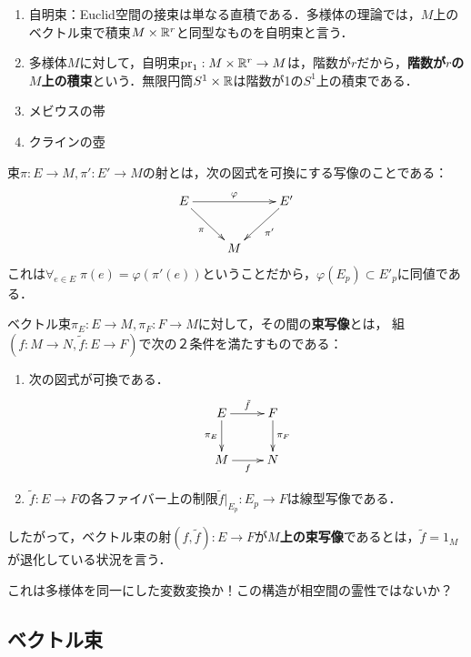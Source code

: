 \documentclass[uplatex,dvipdfmx]{jsreport}
\begin{document}
\begin{example}\mbox{}
    \begin{enumerate}
        \item 自明束：Euclid空間の接束は単なる直積である．多様体の理論では，$M$上のベクトル束で積束$M\times\mathbb{R}^r$と同型なものを自明束と言う．
        \item 多様体$M$に対して，自明束$\mathrm{pr}_1:M\times\mathbb{R}^r\to M$は，階数が$r$だから，\textbf{階数が$r$の$M$上の積束}という．無限円筒$S^1\times\mathbb{R}$は階数が1の$S^1$上の積束である．
        \item メビウスの帯
        \item クラインの壺
    \end{enumerate}
\end{example}

\begin{definition}
    束$\pi:E\to M,\pi':E'\to M$の射とは，次の図式を可換にする写像のことである：
    \[\xymatrix{
        E\ar[rr]^-\varphi\ar[dr]_-{\pi}&&E'\ar[dl]^-{\pi'}\\
        &M
    }\]
    これは$\forall_{e\in E}\;\pi(e)=\varphi(\pi'(e))$ということだから，$\varphi(E_p)\subset E'_p$に同値である．
\end{definition}

\begin{definition}
    ベクトル束$\pi_E:E\to M,\pi_F:F\to M$に対して，その間の\textbf{束写像}とは，
    組$(f:M\to N,\tilde{f}:E\to F)$で次の２条件を満たすものである：
    \begin{enumerate}
        \item 次の図式が可換である．
        \[\xymatrix{
            E\ar[r]^-{\tilde{f}}\ar[d]_-{\pi_E}&F\ar[d]^-{\pi_F}\\
            M\ar[r]_-{f}&N
        }\]
        \item $\tilde{f}:E\to F$の各ファイバー上の制限$\tilde{f}|_{E_p}:E_p\to F$は線型写像である．
    \end{enumerate}
    したがって，ベクトル束の射$(f,\tilde{f}):E\to F$が\textbf{$M$上の束写像}であるとは，$\tilde{f}=1_M$が退化している状況を言う．
\end{definition}

\begin{remarks}[相空間が見えた！]
    これは多様体を同一にした変数変換か！この構造が相空間の霊性ではないか？
\end{remarks}

\subsection{ベクトル束}
\end{document}
